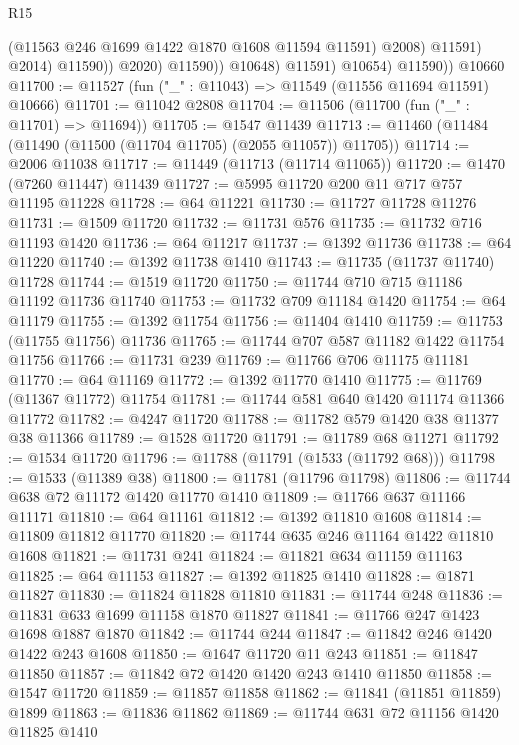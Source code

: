 \begin{lexlean}{R15}
\begin{coremodule}
                              (@11563 @246 @1699 @1422 @1870 @1608 @11594 @11591)
                              @2008)
                            @11591)
                          @2014)
                        @11590))
                    @2020)
                  @11590))
              @10648)
            @11591)
          @10654)
        @11590))
    @10660
@11700 := @11527 (fun ("_" : @11043) => @11549 (@11556 @11694 @11591) @10666)
@11701 := @11042 @2808
@11704 := @11506 (@11700 (fun ("_" : @11701) => @11694))
@11705 := @1547 @11439
@11713 := @11460 (@11484 (@11490 (@11500 (@11704 @11705) (@2055 @11057)) @11705))
@11714 := @2006 @11038
@11717 := @11449 (@11713 (@11714 @11065))
@11720 := @1470 (@7260 @11447) @11439
@11727 := @5995 @11720 @200 @11 @717 @757 @11195 @11228
@11728 := @64 @11221
@11730 := @11727 @11728 @11276
@11731 := @1509 @11720
@11732 := @11731 @576
@11735 := @11732 @716 @11193 @1420
@11736 := @64 @11217
@11737 := @1392 @11736
@11738 := @64 @11220
@11740 := @1392 @11738 @1410
@11743 := @11735 (@11737 @11740) @11728
@11744 := @1519 @11720
@11750 := @11744 @710 @715 @11186 @11192 @11736 @11740
@11753 := @11732 @709 @11184 @1420
@11754 := @64 @11179
@11755 := @1392 @11754
@11756 := @11404 @1410
@11759 := @11753 (@11755 @11756) @11736
@11765 := @11744 @707 @587 @11182 @1422 @11754 @11756
@11766 := @11731 @239
@11769 := @11766 @706 @11175 @11181
@11770 := @64 @11169
@11772 := @1392 @11770 @1410
@11775 := @11769 (@11367 @11772) @11754
@11781 := @11744 @581 @640 @1420 @11174 @11366 @11772
@11782 := @4247 @11720
@11788 := @11782 @579 @1420 @38 @11377 @38 @11366
@11789 := @1528 @11720
@11791 := @11789 @68 @11271
@11792 := @1534 @11720
@11796 := @11788 (@11791 (@1533 (@11792 @68)))
@11798 := @1533 (@11389 @38)
@11800 := @11781 (@11796 @11798)
@11806 := @11744 @638 @72 @11172 @1420 @11770 @1410
@11809 := @11766 @637 @11166 @11171
@11810 := @64 @11161
@11812 := @1392 @11810 @1608
@11814 := @11809 @11812 @11770
@11820 := @11744 @635 @246 @11164 @1422 @11810 @1608
@11821 := @11731 @241
@11824 := @11821 @634 @11159 @11163
@11825 := @64 @11153
@11827 := @1392 @11825 @1410
@11828 := @1871 @11827
@11830 := @11824 @11828 @11810
@11831 := @11744 @248
@11836 := @11831 @633 @1699 @11158 @1870 @11827
@11841 := @11766 @247 @1423 @1698 @1887 @1870
@11842 := @11744 @244
@11847 := @11842 @246 @1420 @1422 @243 @1608
@11850 := @1647 @11720 @11 @243
@11851 := @11847 @11850
@11857 := @11842 @72 @1420 @1420 @243 @1410 @11850
@11858 := @1547 @11720
@11859 := @11857 @11858
@11862 := @11841 (@11851 @11859) @1899
@11863 := @11836 @11862
@11869 := @11744 @631 @72 @11156 @1420 @11825 @1410

\end{coremodule}
\end{lexlean}
